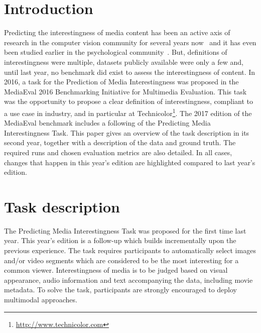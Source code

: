 \documentclass[sigconf]{acmart-me}
\begin{document}
\maketitle

\vspace{-0.2cm}
\section{Introduction}


Predicting the interestingness of media content has been an active axis of research in the computer vision community for several years now~\cite{Jiang2013, Gygli2013, Dhar2011, Amengual2015} and it has even been studied earlier in the psychological community~\cite{Berlyne1960, Smith1985, Silvia2006}. But, definitions of interestingness were multiple, datasets publicly available were only a few and, until last year, no benchmark did exist to assess the interestingness of content. In 2016, a task for the Prediction of Media Interestingness was proposed in the Media\-Eval 2016 Benchmarking Initiative for Multimedia Evaluation. This task was the opportunity to propose a clear definition of interestingness, compliant to a use case in industry, and in particular at Technicolor\footnote{\url{http://www.technicolor.com}}. The 2017 edition of the Media\-Eval benchmark includes a following of the Predicting Media Interestingness Task.
This paper gives an overview of the task description in its second year, together with a description of the data and ground truth. The required runs and chosen evaluation metrics are also detailed. In all cases, changes that happen in this year's edition are highlighted compared to last year's edition.


\vspace{-0.2cm}
\section{Task description}

The Predicting Media Interestingness Task was proposed for the first time last year. This year's edition is a follow-up which builds incrementally upon the previous experience. The task requires participants to automatically select images and/or video segments which are considered to be the most interesting for a common viewer. Interestingness of media is to be judged based on visual appearance, audio information and text accompanying the data, including movie metadata. To solve the task, participants are strongly encouraged to deploy multimodal approaches.
\end{document}
